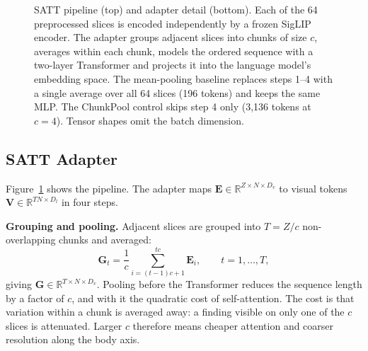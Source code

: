 \documentclass[conference]{IEEEtran}
\begin{document}
\begin{figure}[t]
{}
\caption{SATT pipeline (top) and adapter detail (bottom). Each of the 64
preprocessed slices is encoded independently by a frozen SigLIP encoder. The
adapter groups adjacent slices into chunks of size $c$, averages within each
chunk, models the ordered sequence with a two-layer Transformer and projects
it into the language model's embedding space. The mean-pooling baseline
replaces steps 1--4 with a single average over all 64 slices (196 tokens) and
keeps the same MLP. The ChunkPool control skips step 4 only (3,136 tokens at $c=4$). Tensor shapes omit the batch dimension.}
\label{fig:architecture}
\end{figure}

\subsection{SATT Adapter}\label{sec:method}
Figure~\ref{fig:architecture} shows the pipeline. The adapter maps
$\mathbf{E}\in\mathbb{R}^{Z\times N\times D_v}$ to visual tokens
$\mathbf{V}\in\mathbb{R}^{TN\times D_l}$ in four steps.

\textbf{Grouping and pooling.} Adjacent slices are grouped into $T=Z/c$
non-overlapping chunks and averaged:
\begin{equation}
\mathbf{G}_t=\frac{1}{c}\sum_{i=(t-1)c+1}^{tc}\mathbf{E}_i,\qquad
t=1,\dots,T,
\end{equation}
giving $\mathbf{G}\in\mathbb{R}^{T\times N\times D_v}$. Pooling before the
Transformer reduces the sequence length by a factor of $c$, and with it the
quadratic cost of self-attention. The cost is that variation within a chunk
is averaged away: a finding visible on only one of the $c$ slices is
attenuated. Larger $c$ therefore means cheaper attention and coarser
resolution along the body axis.
\end{document}
